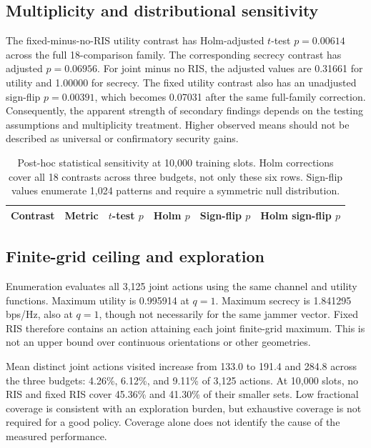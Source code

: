 \documentclass[journal,10pt,twocolumn]{IEEEtran}
\begin{document}
\subsection{Multiplicity and distributional sensitivity}
The fixed-minus-no-RIS utility contrast has Holm-adjusted $t$-test $p=0.00614$ across the full 18-comparison family. The corresponding secrecy contrast has adjusted $p=0.06956$. For joint minus no RIS, the adjusted values are 0.31661 for utility and 1.00000 for secrecy. The fixed utility contrast also has an unadjusted sign-flip $p=0.00391$, which becomes 0.07031 after the same full-family correction. Consequently, the apparent strength of secondary findings depends on the testing assumptions and multiplicity treatment. Higher observed means should not be described as universal or confirmatory security gains.
\begin{table}[t]
\centering
\caption{Post-hoc statistical sensitivity at 10,000 training slots. Holm corrections cover all 18 contrasts across three budgets, not only these six rows. Sign-flip values enumerate 1,024 patterns and require a symmetric null distribution.}
\label{tab:robustness}
\begin{tabular}{llrrrr}
\toprule
Contrast & Metric & $t$-test $p$ & Holm $p$ & Sign-flip $p$ & Holm sign-flip $p$\\
\midrule

\end{tabular}
\end{table}
\subsection{Finite-grid ceiling and exploration}
Enumeration evaluates all 3,125 joint actions using the same channel and utility functions. Maximum utility is 0.995914 at $q=1$. Maximum secrecy is 1.841295 bps/Hz, also at $q=1$, though not necessarily for the same jammer vector. Fixed RIS therefore contains an action attaining each joint finite-grid maximum. This is not an upper bound over continuous orientations or other geometries.

Mean distinct joint actions visited increase from 133.0 to 191.4 and 284.8 across the three budgets: 4.26\%, 6.12\%, and 9.11\% of 3,125 actions. At 10,000 slots, no RIS and fixed RIS cover 45.36\% and 41.30\% of their smaller sets. Low fractional coverage is consistent with an exploration burden, but exhaustive coverage is not required for a good policy. Coverage alone does not identify the cause of the measured performance.
\end{document}
